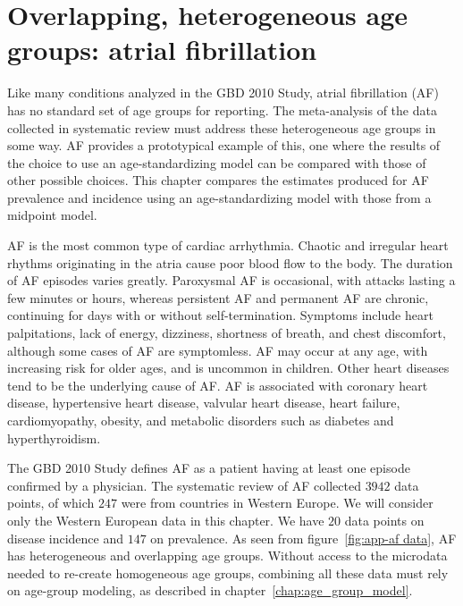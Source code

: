 \chapter{Overlapping, heterogeneous age groups: atrial fibrillation}
\label{applications-age_groups}

Like many conditions analyzed in the GBD 2010 Study, atrial
fibrillation (AF) has no standard set of age groups for reporting.  The
meta-analysis of the data collected in systematic review must address
these heterogeneous age groups in some way. AF provides a prototypical
example of this, one where the results of the choice to
use an age-standardizing model can be compared with those of other possible
choices.  This chapter compares the estimates produced for AF
prevalence and incidence using an age-standardizing model with those
from a midpoint model.

AF is the most common type of cardiac arrhythmia.  Chaotic and
irregular heart rhythms originating in the atria cause poor blood flow
to the body.  The duration of AF episodes varies greatly.
Paroxysmal AF is occasional, with attacks lasting a few minutes or hours,
whereas persistent AF and permanent AF are chronic, continuing for
days with or without self-termination.  Symptoms include
heart palpitations, lack of energy, dizziness, shortness of breath, and
chest discomfort, although some cases of AF are
symptomless.  AF may occur at any age, with increasing risk for older
ages, and is uncommon in children.  Other heart diseases tend to be
the underlying cause of AF.  AF is associated with coronary heart
disease, hypertensive heart disease, valvular heart disease, heart
failure, cardiomyopathy, obesity, and metabolic disorders such as
diabetes and hyperthyroidism. \cite{rich_epidemiology_2009,
  rho_asymptomatic_2005, fuster_acc/aha/esc_2006, radford_atrial_1977,
  TK_ref_from_Mehrdad}

The GBD 2010 Study defines AF as a patient having at least one episode
confirmed by a physician.  The systematic review of AF collected $3942$
data points, of which $247$ were from countries in Western Europe.  We
will consider only the Western European data in this chapter.
We have $20$ data points on disease incidence and $147$ on prevalence.
As seen from figure~\ref{fig:app-af data}, AF has
heterogeneous and overlapping age groups.  Without access to the
microdata needed to re-create homogeneous age groups, combining all
these data must rely on age-group modeling, as described in
chapter~\ref{chap:age_group_model}.

